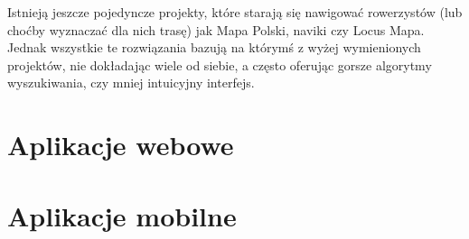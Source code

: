 Istnieją jeszcze pojedyncze projekty, które starają się nawigować rowerzystów (lub choćby wyznaczać dla nich trasę) jak Mapa Polski, naviki czy Locus Mapa. Jednak wszystkie te rozwiązania bazują na którymś z wyżej wymienionych projektów, nie dokładając wiele od siebie, a często oferując gorsze algorytmy wyszukiwania, czy mniej intuicyjny interfejs. 

\section{Aplikacje webowe}



\section{Aplikacje mobilne}


